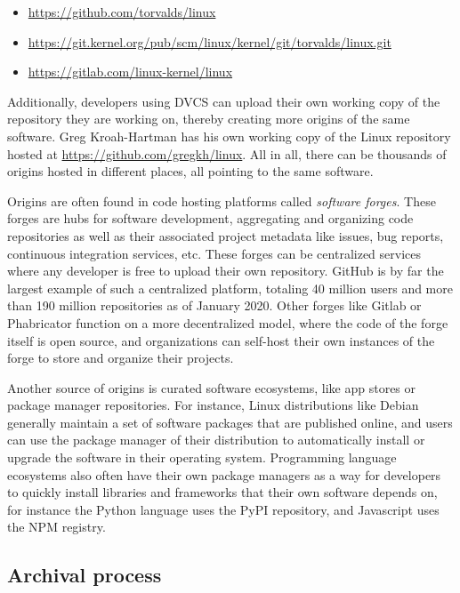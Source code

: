 \begin{itemize}[ ]
    \setlength\itemsep{-0.5em}
    \item \url{https://github.com/torvalds/linux}
    \item \url{https://git.kernel.org/pub/scm/linux/kernel/git/torvalds/linux.git}
    \item \url{https://gitlab.com/linux-kernel/linux}
\end{itemize}

Additionally, developers using \gls{DVCS} can upload their own working copy of
the repository they are working on, thereby creating more origins of the same
software. Greg Kroah-Hartman has his own working copy of the Linux repository
hosted at \url{https://github.com/gregkh/linux}. All in all, there can be
thousands of origins hosted in different places, all pointing to the same
software.

Origins are often found in code hosting platforms called \emph{software
forges}. These forges are hubs for software development, aggregating and
organizing code repositories as well as their associated project metadata like
issues, bug reports, continuous integration services, etc.  These forges can be
centralized services where any developer is free to upload their own
repository. GitHub is by far the largest example of such a centralized
platform, totaling 40 million users and more than 190 million repositories as
of January 2020. Other forges like Gitlab or Phabricator function on a more
decentralized model, where the code of the forge itself is open source, and
organizations can self-host their own instances of the forge to store and
organize their projects.

Another source of origins is curated software ecosystems, like app stores or
package manager repositories. For instance, Linux distributions like Debian
generally maintain a set of software packages that are published online, and
users can use the package manager of their distribution to automatically
install or upgrade the software in their operating system. Programming language
ecosystems also often have their own package managers as a way for developers
to quickly install libraries and frameworks that their own software depends on,
for instance the Python language uses the PyPI repository, and Javascript uses
the NPM registry.

\subsection{Archival process}


